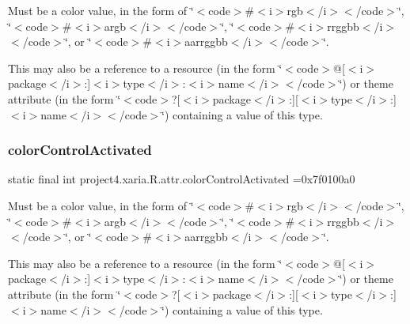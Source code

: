 Must be a color value, in the form of \char`\"{}$<$code$>$\#$<$i$>$rgb$<$/i$>$$<$/code$>$\char`\"{}, \char`\"{}$<$code$>$\#$<$i$>$argb$<$/i$>$$<$/code$>$\char`\"{}, \char`\"{}$<$code$>$\#$<$i$>$rrggbb$<$/i$>$$<$/code$>$\char`\"{}, or \char`\"{}$<$code$>$\#$<$i$>$aarrggbb$<$/i$>$$<$/code$>$\char`\"{}. 

This may also be a reference to a resource (in the form \char`\"{}$<$code$>$@\mbox{[}$<$i$>$package$<$/i$>$\+:\mbox{]}$<$i$>$type$<$/i$>$\+:$<$i$>$name$<$/i$>$$<$/code$>$\char`\"{}) or theme attribute (in the form \char`\"{}$<$code$>$?\mbox{[}$<$i$>$package$<$/i$>$\+:\mbox{]}\mbox{[}$<$i$>$type$<$/i$>$\+:\mbox{]}$<$i$>$name$<$/i$>$$<$/code$>$\char`\"{}) containing a value of this type. \mbox{\label{classproject4_1_1xaria_1_1R_1_1attr_ac529c7d1311c2366a78d355bba3654a5}} 
\subsubsection{\texorpdfstring{color\+Control\+Activated}{colorControlActivated}}
{\footnotesize\ttfamily static final int project4.\+xaria.\+R.\+attr.\+color\+Control\+Activated =0x7f0100a0\hspace{0.3cm}{\ttfamily [static]}}

Must be a color value, in the form of \char`\"{}$<$code$>$\#$<$i$>$rgb$<$/i$>$$<$/code$>$\char`\"{}, \char`\"{}$<$code$>$\#$<$i$>$argb$<$/i$>$$<$/code$>$\char`\"{}, \char`\"{}$<$code$>$\#$<$i$>$rrggbb$<$/i$>$$<$/code$>$\char`\"{}, or \char`\"{}$<$code$>$\#$<$i$>$aarrggbb$<$/i$>$$<$/code$>$\char`\"{}. 

This may also be a reference to a resource (in the form \char`\"{}$<$code$>$@\mbox{[}$<$i$>$package$<$/i$>$\+:\mbox{]}$<$i$>$type$<$/i$>$\+:$<$i$>$name$<$/i$>$$<$/code$>$\char`\"{}) or theme attribute (in the form \char`\"{}$<$code$>$?\mbox{[}$<$i$>$package$<$/i$>$\+:\mbox{]}\mbox{[}$<$i$>$type$<$/i$>$\+:\mbox{]}$<$i$>$name$<$/i$>$$<$/code$>$\char`\"{}) containing a value of this type. \mbox{\label{classproject4_1_1xaria_1_1R_1_1attr_a7164700c51b85b21d296a586de8c375c}} 
